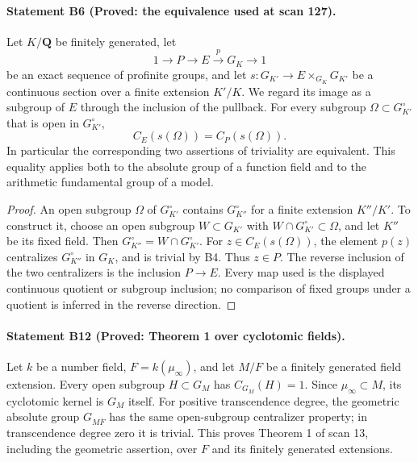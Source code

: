 \paragraph{Statement B6 (Proved: the equivalence used at scan 127).}\label{res:B6}
Let $K/\mathbf Q$ be finitely generated, let
\[
 1\longrightarrow P\longrightarrow E\xrightarrow{p}G_K\longrightarrow1
\]
be an exact sequence of profinite groups, and let
$s:G_{K'}\to E\times_{G_K}G_{K'}$ be a continuous section over a finite
extension $K'/K$. We regard its image as a subgroup of $E$ through the
inclusion of the pullback. For every subgroup $\Omega\subset G_{K'}^\circ$
that is open in $G_{K'}^\circ$,
\[
 C_E(s(\Omega))=C_P(s(\Omega)).
\]
In particular the corresponding two assertions of triviality are
equivalent. This equality applies both to the absolute group of a
function field and to the arithmetic fundamental group of a model.

\begin{proof}
An open subgroup $\Omega$ of $G_{K'}^\circ$ contains
$G_{K''}^\circ$ for a finite extension $K''/K'$.
To construct it, choose an open subgroup $W\subset G_{K'}$ with
$W\cap G_{K'}^\circ\subset\Omega$, and let $K''$ be its fixed field.
Then $G_{K''}^\circ=W\cap G_{K'}^\circ$. For
$z\in C_E(s(\Omega))$, the element $p(z)$ centralizes
$G_{K''}^\circ$ in $G_K$, and is trivial by B4. Thus $z\in P$.
The reverse inclusion of the two centralizers is the inclusion $P\to E$.
Every map used is the displayed continuous quotient or subgroup inclusion;
no comparison of fixed groups under a quotient is inferred in the reverse
direction.
\end{proof}

\paragraph{Statement B12 (Proved: Theorem 1 over cyclotomic fields).}\label{res:B12}
Let $k$ be a number field, $F=k(\mu_\infty)$, and let $M/F$ be a finitely
generated field extension. Every open subgroup $H\subset G_M$ has
$C_{G_M}(H)=1$. Since $\mu_\infty\subset M$, its cyclotomic kernel is
$G_M$ itself. For positive transcendence degree, the geometric absolute
group $G_{M\overline F}$ has the same open-subgroup centralizer property;
in transcendence degree zero it is trivial. This proves Theorem 1 of scan
13, including the geometric assertion, over $F$ and its finitely generated
extensions.

